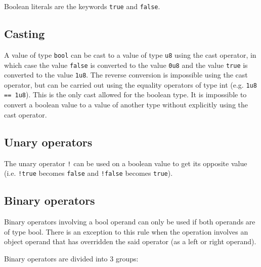 Boolean literals are the keywords \texttt{true} and \texttt{false}.

\subsection{Casting}
\label{sec:org7cd1f94}

A value of type \texttt{bool} can be cast to a value of type \texttt{u8} using
the cast operator, in which case the value \texttt{false} is converted to the
value \texttt{0u8} and the value \texttt{true} is converted to the value
\texttt{1u8}. The reverse conversion is impossible using the cast operator, but
can be carried out using the equality operators of type int (e.g. \texttt{1u8 ==
  1u8}). This is the only cast allowed for the boolean type. It is impossible to
convert a boolean value to a value of another type without explicitly using the
cast operator.

\subsection{Unary operators}
\label{sec:orgb412ce4}

The unary operator \texttt{!} can be used on a boolean value to get its opposite
value (i.e. \texttt{!true} becomes \texttt{false} and \texttt{!false} becomes
\texttt{true}).

\subsection{Binary operators}
\label{sec:org030ae50}

Binary operators involving a bool operand can only be used if both operands are
of type bool. There is an exception to this rule when the operation involves an
object operand that has overridden the said operator (as a left or right
operand).

Binary operators are divided into 3 groups:

